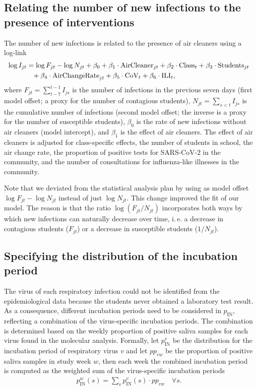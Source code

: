 \documentclass[fleqn,11pt]{wlscirep_supp}
\newcommand\ie{i.\,e.\xspace}
\begin{document}
\subsection{Relating the number of new infections to the presence of interventions}

The  number of new infections is related to the presence of air cleaners using a log-link
\begin{align*}
    \log I_{jt} &= \log F_{jt} - \log N_{jt} + \beta_0 + \beta_1 \cdot \text{AirCleaner}_{jt} + \beta_2 \cdot \text{Class}_t + \beta_3 \cdot \text{Students}_{jt} \\
    &\hphantom{= }+ \beta_4 \cdot \text{AirChangeRate}_{jt} + \beta_5 \cdot \text{CoV}_t + \beta_6 \cdot \text{ILI}_t,
\end{align*}
where $F_{jt} = \sum_{t-7}^{t-1} I_{js}$ is the number of infections in the previous seven days (first model offset; a proxy for the number of contagious students), $N_{jt} = \sum_{s<t} I_{js}$ is the cumulative number of infections (second model offset; the inverse is a proxy for the number of susceptible students), $\beta_0$ is the rate of new infections without air cleaners (model intercept), and $\beta_1$ is the effect of air cleaners. The effect of air cleaners is adjusted for class-specific effects, the number of students in school, the air change rate, the proportion of positive tests for SARS-CoV-2 in the community, and the number of consultations for influenza-like illnesses in the community. 

Note that we deviated from the statistical analysis plan by using as model offset $\log F_{jt} - \log N_{jt}$ instead of just $\log N_{jt}$. This change improved the fit of our model. The reason is that the ratio $\log (F_{jt} / N_{jt})$ incorporates both ways by which new infections can naturally decrease over time, \ie a decrease in contagious students ($F_{jt}$) or a decrease in susceptible students ($1 / N_{jt}$).

\subsection{Specifying the distribution of the incubation period}

The virus of each respiratory infection could not be identified from the epidemiological data because the students never obtained a laboratory test result. As a consequence, different incubation periods need to be considered in $p_{\text{IN}}$, reflecting a combination of the virus-specific incubation periods. The combination is determined based on the weekly proportion of positive saliva samples for each virus found in the molecular analysis. Formally, let $p_{\text{IN}}^{v}$ be the distribution for the incubation period of respiratory virus $v$ and let $pp_{vw}$ be the proportion of positive saliva samples in study week $w$, then each week the combined incubation period is computed as the weighted sum of the virus-specific incubation periods
\begin{align}
    p_{\text{IN}}^w(s) = \sum_{v} p_{\text{IN}}^{v}(s) \cdot pp_{vw} \quad \forall s.
\end{align}
\end{document}
